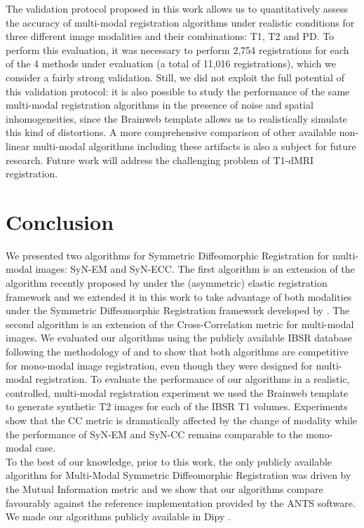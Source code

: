 The validation protocol proposed in this work allows us to quantitatively assess the accuracy of multi-modal registration algorithms under realistic conditions for three different image modalities and their combinations: T1, T2 and PD. To perform this evaluation, it was necessary to perform 2,754 registrations for each of the 4 methods under evaluation (a total of 11,016 registrations), which we consider a fairly strong validation. Still, we did not exploit the full potential of this validation protocol: it is also possible to study the performance of the same multi-modal registration algorithms in the presence of noise and spatial inhomogeneities, since the Brainweb template allows us to realistically simulate this kind of distortions. A more comprehensive comparison of other available non-linear multi-modal algorithms including these artifacts is also a subject for future research. Future work will address the challenging problem of T1-dMRI registration.


\section{Conclusion}
We presented two algorithms for Symmetric Diffeomorphic Registration for multi-modal images: SyN-EM and SyN-ECC. The first algorithm is an extension of the algorithm recently proposed by \cite{Arce-santana2014} under the (asymmetric) elastic registration framework and we extended it in this work to take advantage of both modalities under the Symmetric Diffeomorphic Registration framework developed by \cite{Avants2008, Avants2011}. The second algorithm is an extension of the Cross-Correlation metric for multi-modal images. We evaluated our algorithms using the publicly available IBSR database following the methodology of \cite{Klein2009, Klein2010} and \cite{Rohlfing2012} to show that both algorithms are competitive for mono-modal image registration, even though they were designed for multi-modal registration. To evaluate the performance of our algorithms in a realistic, controlled, multi-modal registration experiment we used the Brainweb \citep{Cocosco1997, Kwan1999} template to generate synthetic T2 images for each of the IBSR T1 volumes. Experiments show that the CC metric is dramatically affected by the change of modality while the performance of SyN-EM and SyN-CC remains comparable to the mono-modal case.\\

To the best of our knowledge, prior to this work, the only publicly available algorithm for Multi-Modal Symmetric Diffeomorphic Registration was driven by the Mutual Information metric and we show that our algorithms compare favourably against the reference implementation provided by the ANTS software. We made our algorithms
publicly available in Dipy \citep{Garyfallidis2014}.
